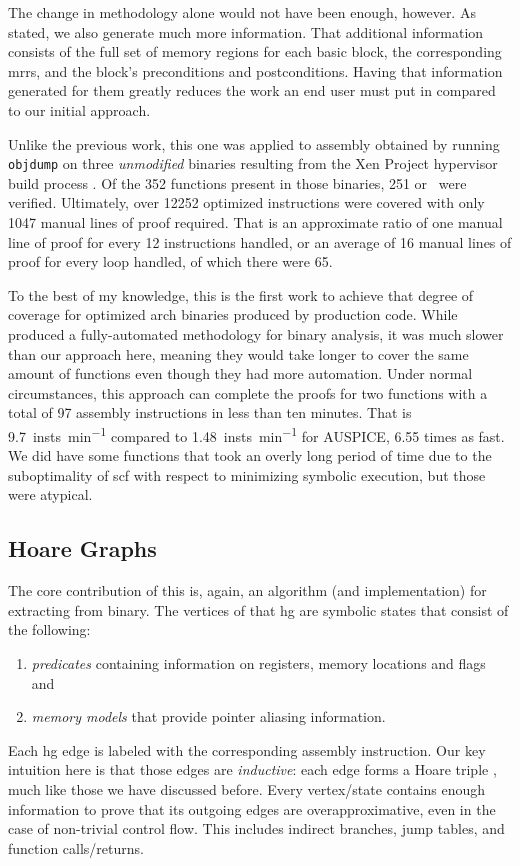 The change in methodology alone would not have been enough, however.
As stated, we also generate much more information.
That additional information consists of the full set of memory regions
for each basic block, the corresponding \acp{mrr},
and the block's preconditions and postconditions.
Having that information generated for them greatly reduces the work an end user
must put in compared to our initial approach.

Unlike the previous work, this one was applied to assembly obtained
by running \texttt{objdump} on three \emph{unmodified} binaries resulting from the
Xen Project hypervisor build process \autocite{chisnall2008definitive}.
Of the \num{352} functions present in those binaries,
\num{251} or \xenpercentage\ were verified.
Ultimately, over \num{12252} optimized instructions were covered
with only \num{1047} manual lines of proof required.
That is an approximate ratio of one manual line of proof
for every \num{12} instructions handled,
or an average of \num{16} manual lines of proof for every loop handled,
of which there were \num{65}.

To the best of my knowledge, this is the first work to achieve
that degree of coverage for optimized \gls{arch} binaries produced by production code.
While \textcite{tan2015auspice} produced a fully-automated methodology
for binary analysis, it was much slower than our approach here,
meaning they would take longer to cover the same amount of functions
even though they had more automation.
Under normal circumstances, this approach can complete the proofs for two functions
with a total of \num{97} assembly instructions in less than ten minutes.
That is \SI{9.7}{insts\per\minute} compared to \SI{1.48}{insts\per\minute}
for AUSPICE, \num{6.55} times as fast. We did have some functions that took
an overly long period of time due to the suboptimality of \acl*{scf}
with respect to minimizing symbolic execution, but those were atypical.

\subsection{Hoare Graphs}
The core contribution of this  is, again, an algorithm (and implementation) for extracting  from  binary.
The vertices of that \ac{hg} are symbolic states that consist of the following:
\begin{enumerate}
  \item \emph{predicates} containing information on registers, memory locations and flags and
  \item \emph{memory models} that provide pointer aliasing information.
\end{enumerate}
Each \ac{hg} edge is labeled with the corresponding assembly instruction.
Our key intuition here is that those edges are  \emph{inductive}:
each edge forms a Hoare triple \autocite{hoare1969axiomatic},
much like those we have discussed before.
Every vertex/state contains enough information to prove that its outgoing edges are overapproximative,
even in the case of non-trivial control flow.
This includes indirect branches, jump tables, and function calls/returns.

